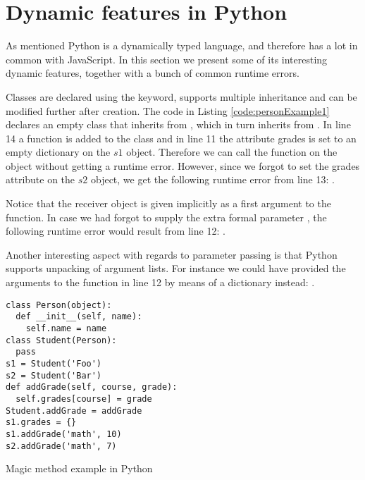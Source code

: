 \chapter{Dynamic features in Python}
As mentioned Python is a dynamically typed language, and therefore has a lot in common with JavaScript. 
In this section we present some of its interesting dynamic features, together with a bunch of common runtime errors. 

Classes are declared using the  keyword, supports multiple inheritance and can be modified further after creation. 
The code in  Listing \ref{code:personExample1} declares an empty  class that inherits from , 
which in turn inherits from . In line 14 a function  is added to the  
class and in line 11 the attribute grades is set to an empty dictionary on the $s1$ object. Therefore we can call the  
function on the  object without getting a runtime error. However, since we forgot to set the grades attribute on the $s2$ object, 
we get the following runtime error from line 13: . 

Notice that the receiver object is given implicitly as a first argument to the  function. 
In case we had forgot to supply the extra formal parameter , the following runtime error would result from line 12:
. 

Another interesting aspect with regards to parameter passing is that Python supports unpacking of argument lists. 
For instance we could have provided the arguments to the  function in line 12 by means of a dictionary instead: 
.

\begin{listing}[H]
  \begin{verbatim}
class Person(object):
  def __init__(self, name):
    self.name = name
class Student(Person):
  pass
s1 = Student('Foo')
s2 = Student('Bar')
def addGrade(self, course, grade):
  self.grades[course] = grade
Student.addGrade = addGrade
s1.grades = {}
s1.addGrade('math', 10)
s2.addGrade('math', 7)
  \end{verbatim}
  \caption{Magic method example in Python}\label{code:personExample1}
\end{listing}

